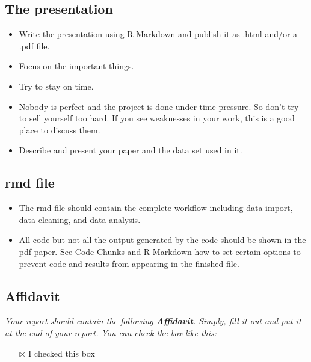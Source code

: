 \documentclass[
  12pt,
]{article}
\providecommand{\tightlist}{%
  \setlength{\itemsep}{0pt}\setlength{\parskip}{0pt}}
\begin{document}
\hypertarget{the-presentation}{%
\subsection{The presentation}\label{the-presentation}}

\begin{itemize}
\tightlist
\item
  Write the presentation using R Markdown and publish it as .html and/or a .pdf file.
\item
  Focus on the important things.
\item
  Try to stay on time.
\item
  Nobody is perfect and the project is done under time pressure. So don't try to sell yourself too hard. If you see weaknesses in your work, this is a good place to discuss them.
\item
  Describe and present your paper and the data set used in it.
\end{itemize}

\hypertarget{rmd-file}{%
\subsection{rmd file}\label{rmd-file}}

\begin{itemize}
\tightlist
\item
  The rmd file should contain the complete workflow including data import, data cleaning, and data analysis.
\item
  All code but not all the output generated by the code should be shown in the pdf paper. See \href{https://rmarkdown.rstudio.com/lesson-3.html}{Code Chunks and R Markdown} how to set certain options to prevent code and results from appearing in the finished file.
\end{itemize}

\hypertarget{affidavit}{%
\subsection{Affidavit}\label{affidavit}}

\emph{Your report should contain the following \textbf{Affidavit}. Simply, fill it out and put it at the end of your report. You can check the box like this:}

\begin{itemize}
\tightlist
\item[$\boxtimes$]
  I checked this box
\end{itemize}
\end{document}
